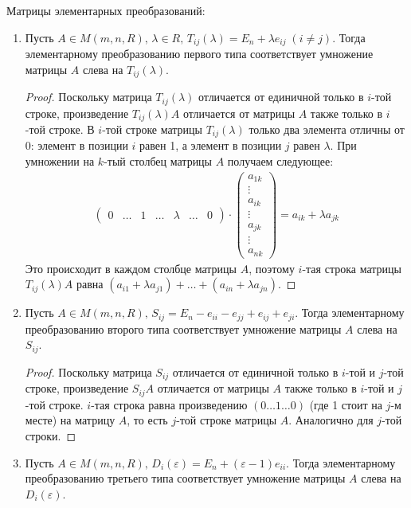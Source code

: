 Матрицы элементарных преобразований:
\begin{enumerate}
    \item Пусть $A \in M(m, n, R), \, \lambda \in R, \, T_{ij}(\lambda) = E_n + \lambda e_{ij} \; (i \neq j)$. 
    Тогда элементарному преобразованию первого типа соответствует умножение матрицы $A$ слева на $T_{ij}(\lambda)$. 

    \begin{proof}
        Поскольку матрица $T_{ij}(\lambda)$ отличается от единичной только в $i$-той строке, произведение $T_{ij}(\lambda)A$ отличается от матрицы $A$ также только в $i$-той строке.
        В $i$-той строке матрицы $T_{ij}(\lambda)$ только два элемента отличны от 0:
        элемент в позиции $i$ равен 1, а элемент  в позиции $j$ равен $\lambda$. 
        При умножении на $k$-тый столбец матрицы $A$ получаем следующее:
        \begin{gather*}
            \begin{pmatrix}
                0 & \dots & 1 & \dots & \lambda & \dots & 0
            \end{pmatrix} \cdot
            \begin{pmatrix}
                a_{1k} \\ \vdots \\ a_{ik} \\ \vdots \\ a_{jk} \\ \vdots \\ a_{nk}
            \end{pmatrix} = a_{ik} + \lambda a_{jk}
        \end{gather*}
        Это происходит в каждом столбце матрицы $A$, поэтому $i$-тая строка матрицы $T_{ij}(\lambda)A$ равна $(a_{i1} + \lambda a_{j1}) + \dots + (a_{in} + \lambda a_{jn})$.
    \end{proof}
    \item Пусть $A \in M(m, n, R), \, S_{ij} = E_n - e_{ii} - e_{jj} + e_{ij} + e_{ji}$.
    Тогда элементарному преобразованию второго типа соответствует умножение матрицы $A$ слева на $S_{ij}$.
    
    \begin{proof}
        Поскольку матрица $S_{ij}$ отличается от единичной только в $i$-той и $j$-той строке, произведение $S_{ij}A$ отличается от матрицы $A$ также только в $i$-той и $j$-той строке.
        $i$-тая строка равна произведению $(0 \dots 1 \dots 0)$ (где 1 стоит на $j$-м месте) на матрицу $A$, то есть $j$-той строке матрицы $A$.
        Аналогично для $j$-той строки.
    \end{proof}
    \item Пусть $A \in M(m, n, R), \, D_i(\varepsilon) = E_n + (\varepsilon - 1)e_{ii}$.
    Тогда элементарному преобразованию третьего типа соответствует умножение матрицы $A$ слева на $D_i(\varepsilon)$.
    

\end{enumerate}
